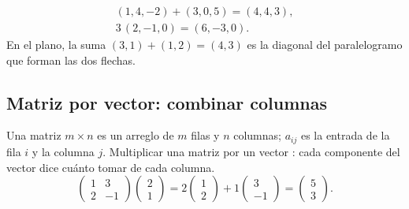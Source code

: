 \documentclass[11pt,a4paper]{article}
\begin{document}
\begin{minipage}[c]{0.52\linewidth}
\begin{ejemplo}
\begin{gather*} (1,4,-2)+(3,0,5)=(4,4,3),\\ 3\,(2,-1,0)=(6,-3,0). \end{gather*}
En el plano, la suma $(3,1)+(1,2)=(4,3)$ es la diagonal del paralelogramo que forman las dos flechas.
\end{ejemplo}
\end{minipage}\hfill
\begin{minipage}[c]{0.44\linewidth}\centering
{}
\end{minipage}

\subsection{Matriz por vector: combinar columnas}
Una matriz $m\times n$ es un arreglo de $m$ filas y $n$ columnas; $a_{ij}$ es la entrada de la fila $i$ y la columna $j$.
Multiplicar una matriz por un vector : cada componente del vector dice cuánto tomar de cada columna.
\[ \begin{pmatrix} 1 & 3\\ 2 & -1 \end{pmatrix}\begin{pmatrix} 2\\ 1 \end{pmatrix}
=2\begin{pmatrix} 1\\ 2 \end{pmatrix}+1\begin{pmatrix} 3\\ -1 \end{pmatrix}=\begin{pmatrix} 5\\ 3 \end{pmatrix}. \]
\end{document}
